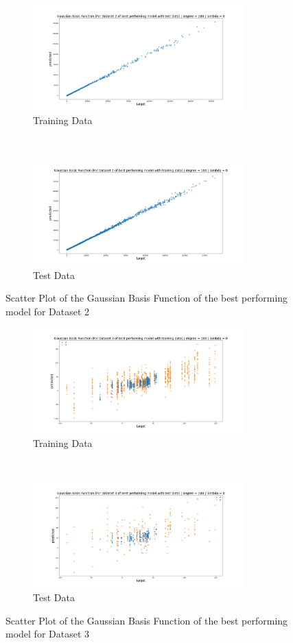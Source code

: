 \begin{figure}[t]
    \centering
    \begin{subfigure}[t]{0.50\textwidth}
        \centering
        \includegraphics[height=1.6in]{Task 3 Images/3.1.42.png}
        \caption{Training Data}
    \end{subfigure}%
    ~ 
    \begin{subfigure}[t]{0.50\textwidth}
        \centering
        \includegraphics[height=1.6in]{Task 3 Images/3.1.41.png}
        \caption{Test Data }
    \end{subfigure}%
    \caption{Scatter Plot of the Gaussian Basis Function of the best performing model for Dataset 2}
    \label{fig:17}
\end{figure}

\begin{figure}[tb]
    \centering
    \begin{subfigure}[t]{0.50\textwidth}
        \centering
        \includegraphics[height=1.6in]{Task 3 Images/3.2.51.png}
        \caption{Training Data}
    \end{subfigure}%
    ~ 
    \begin{subfigure}[t]{0.50\textwidth}
        \centering
        \includegraphics[height=1.6in]{Task 3 Images/3.2.52.png}
        \caption{Test Data }
    \end{subfigure}%
    \caption{Scatter Plot of the Gaussian Basis Function of the best performing model for Dataset 3}
    \label{fig:18}
\end{figure}
